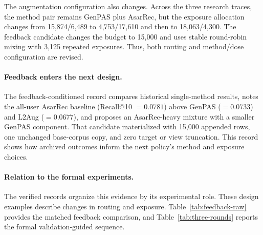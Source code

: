 The augmentation configuration also changes. Across the three research
traces, the method pair remains GenPAS plus AsarRec, but the exposure
allocation changes from 15,874/6,489 to 4,753/17,610 and then to
18,063/4,300. The feedback candidate changes the budget to 15,000 and uses
stable round-robin mixing with 3,125 repeated exposures. Thus, both routing
and method/dose configuration are revised.

\paragraph{Feedback enters the next design.}
The feedback-conditioned record compares historical single-method results,
notes the all-user AsarRec baseline (Recall@10 $=0.0781$) above GenPAS ($=0.0733$)
and L2Aug ($=0.0677$), and proposes an AsarRec-heavy mixture with a smaller
GenPAS component. That candidate materialized with 15,000 appended rows, one
unchanged base-corpus copy, and zero target or view truncation. This record shows
how archived outcomes inform the next policy's method and exposure choices.

\paragraph{Relation to the formal experiments.}
The verified records organize this evidence by its experimental role.
These design examples describe changes in routing and exposure.
Table~\ref{tab:feedback-raw} provides the matched feedback comparison, and
Table~\ref{tab:three-rounds} reports the formal validation-guided sequence.

